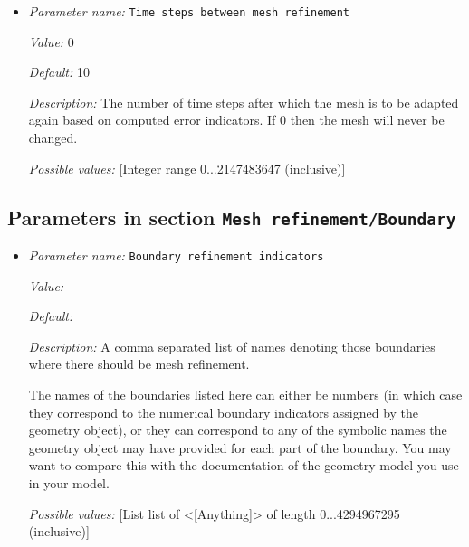 \begin{itemize}
{\it Possible values:} [MultipleSelection boundary|composition|density|maximum refinement function|minimum refinement function|nonadiabatic temperature|particle density|slope|strain rate|temperature|thermal energy density|topography|velocity|viscosity ]
\item {\it Parameter name:} {\tt Time steps between mesh refinement}
\label{parameters:Mesh refinement/Time steps between mesh refinement}


{\it Value:} 0


{\it Default:} 10


{\it Description:} The number of time steps after which the mesh is to be adapted again based on computed error indicators. If 0 then the mesh will never be changed.


{\it Possible values:} [Integer range 0...2147483647 (inclusive)]
\end{itemize}



\subsection{Parameters in section \tt Mesh refinement/Boundary}
\label{parameters:Mesh_20refinement/Boundary}

\begin{itemize}
\item {\it Parameter name:} {\tt Boundary refinement indicators}
\label{parameters:Mesh refinement/Boundary/Boundary refinement indicators}


{\it Value:} 


{\it Default:} 


{\it Description:} A comma separated list of names denoting those boundaries where there should be mesh refinement.

The names of the boundaries listed here can either be numbers (in which case they correspond to the numerical boundary indicators assigned by the geometry object), or they can correspond to any of the symbolic names the geometry object may have provided for each part of the boundary. You may want to compare this with the documentation of the geometry model you use in your model.


{\it Possible values:} [List list of <[Anything]> of length 0...4294967295 (inclusive)]
\end{itemize}

